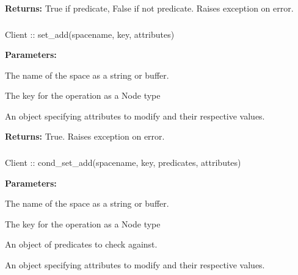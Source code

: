\noindent\textbf{Returns:}
True if predicate, False if not predicate.  Raises exception on error.

\subsubsection{}
\label{api:nodejs:set_add}
\begin{javascriptcode}
Client :: set_add(spacename, key, attributes)
\end{javascriptcode}


\noindent\textbf{Parameters:}
\begin{description}[labelindent=\widthof{{\code{attributes}}},leftmargin=*,noitemsep,nolistsep,align=right]
\item[\code{spacename}] The name of the space as a string or buffer.
\item[\code{key}] The key for the operation as a Node type
\item[\code{attributes}] An object specifying attributes to modify and their respective values.
\end{description}

\noindent\textbf{Returns:}
True.  Raises exception on error.

\subsubsection{}
\label{api:nodejs:cond_set_add}
\begin{javascriptcode}
Client :: cond_set_add(spacename, key, predicates, attributes)
\end{javascriptcode}


\noindent\textbf{Parameters:}
\begin{description}[labelindent=\widthof{{\code{predicates}}},leftmargin=*,noitemsep,nolistsep,align=right]
\item[\code{spacename}] The name of the space as a string or buffer.
\item[\code{key}] The key for the operation as a Node type
\item[\code{predicates}] An object of predicates to check against.
\item[\code{attributes}] An object specifying attributes to modify and their respective values.
\end{description}

